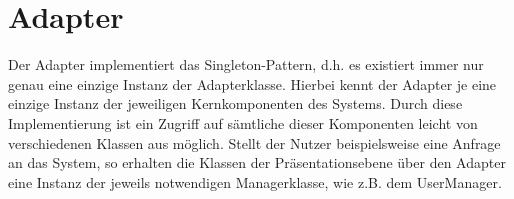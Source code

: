 \section{Adapter}


Der Adapter implementiert das Singleton-Pattern, d.h. es existiert immer nur genau eine einzige Instanz der Adapterklasse. Hierbei kennt der Adapter je eine einzige Instanz der jeweiligen Kernkomponenten des Systems. Durch diese Implementierung ist ein Zugriff auf sämtliche dieser Komponenten leicht von verschiedenen Klassen aus möglich. Stellt der Nutzer beispielsweise eine Anfrage an das System, so erhalten die Klassen der Präsentationsebene über den Adapter eine Instanz der jeweils notwendigen Managerklasse, wie z.B. dem UserManager. 